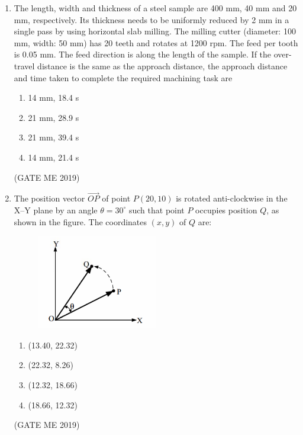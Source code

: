 \documentclass[journal]{IEEEtran}
\begin{document}
\begin{enumerate}
\item The length, width and thickness of a steel sample are 400 mm, 40 mm and 20 mm, respectively. Its thickness needs to be uniformly reduced by 2 mm in a single pass by using horizontal slab milling. The milling cutter (diameter: 100 mm, width: 50 mm) has 20 teeth and rotates at 1200 rpm. The feed per tooth is 0.05 mm. The feed direction is along the length of the sample. If the over-travel distance is the same as the approach distance, the approach distance and time taken to complete the required machining task are
\begin{multicols}{2}
\begin{enumerate}
    \item 14 mm, 18.4 s
    \item 21 mm, 28.9 s
    \item 21 mm, 39.4 s
    \item 14 mm, 21.4 s
\end{enumerate}
\end{multicols}
\hfill (GATE ME 2019)

\item The position vector $\overrightarrow{OP}$ of point $P(20, 10)$ is rotated anti-clockwise in the X–Y plane by an angle $\theta = 30^\circ$ such that point $P$ occupies position $Q$, as shown in the figure. The coordinates $(x, y)$ of $Q$ are:

\begin{figure}[H]
\centering
\includegraphics[width=0.5\textwidth]{Fig 5.png}
\caption{}
\label{fig:question16}
\end{figure}

\begin{multicols}{4}
\begin{enumerate}
\item (13.40, 22.32) 
\item (22.32, 8.26)  
\item (12.32, 18.66)  
\item (18.66, 12.32)  
\end{enumerate}
\end{multicols}
\hfill (GATE ME 2019)


\end{enumerate}
\end{document}
